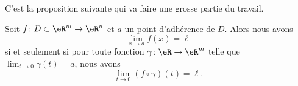 \newcommand{\CaptionFigMethodeChemin}{Sur toute la droite $y=-x$, la fonction vaut $-1/2$, tandis que sur toute la droite $y=x/2$, elle vaut $\frac{2}{ 5 }$. Il est donc impossible que la fonction ait une limite en $(0,0)$, parce que dans toute boule autour de zéro, il y aura toujours un point de chacune de ces deux droites.}


C'est la proposition suivante qui va faire une grosse partie du travail.  
\begin{proposition}     \label{PROPooSAFIooWvmSiT}
	Soit $f\colon D\subset\eR^m\to \eR^n$ et $a$ un point d'adhérence de $D$. Alors nous avons
	\begin{equation}
		\lim_{x\to a} f(x)=\ell
	\end{equation}
	si et seulement si pour toute fonction $\gamma\colon \eR\to \eR^m$ telle que $\lim_{t\to 0} \gamma(t)=a$, nous avons
	\begin{equation}
		\lim_{t\to 0} (f\circ\gamma)(t)=\ell.
	\end{equation}
\end{proposition}

